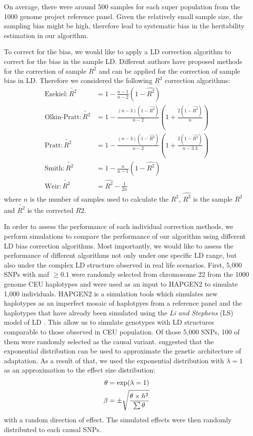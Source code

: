 		On average, there were around 500 samples for each super population from the 1000 genome project reference panel.
		Given the relatively small sample size, the sampling bias might be high, therefore lead to systematic bias in the heritability estimation in our algorithm.
		
		To correct for the bias, we would like to apply a \gls{LD} correction algorithm to correct for the bias in the sample \gls{LD}.
		Different authors \citep{Weir1980,Wang2007} have proposed methods for the correction of sample $R^2$ and can be applied for the correction of sample bias in \gls{LD}.
		Therefore we considered the following $R^2$ correction algorithms:
		\begin{align}
		\text{Ezekiel}: \tilde{R^2}&= 1-\frac{n-1}{n-2}(1-\hat{R^2})\label{eq:ezekiel} \\
		\text{Olkin-Pratt}: \tilde{R^2}&=1-\frac{(n-3)(1-\hat{R^2})}{n-2}(1+\frac{2(1-\hat{R^2})}{n})\label{eq:okin} \\
		\text{Pratt}: \tilde{R^2}&=1-\frac{(n-3)(1-\hat{R^2})}{n-2}(1+\frac{2(1-\hat{R^2})}{n-3.3})\label{eq:pratt} \\
		\text{Smith}: \tilde{R^2}&=1-\frac{n}{n-1}(1-\hat{R^2}) \label{eq:smith}\\
		\text{Weir}: \tilde{R^2}&=\hat{R^2}-\frac{1}{2n} \label{eq:weir}
		\end{align}
		where $n$ is the number of samples used to calculate the $R^2$, $\hat{R^2}$ is the sample $R^2$ and $\tilde{R^2}$ is the corrected $R2$.
		
		In order to assess the performance of each individual correction methods, we perform simulations to compare the performance of our algorithm using different \gls{LD} bias correction algorithms.
		Most importantly, we would like to assess the performance of different algorithms not only under one specific \gls{LD} range, but also under the complex \gls{LD} structure observed in real life scenarios.
		First, 5,000 \glspl{SNP} with \gls{maf} $\ge0.1$ were randomly selected from chromosome 22 from the 1000 genome \gls{CEU} haplotypes and were used as an input to HAPGEN2 \citep{Su2011} to simulate 1,000 individuals.
		HAPGEN2 is a simulation tools which simulates new haplotypes as an imperfect mosaic of haplotpyes from a reference panel and the haplotypes that have already been simulated using the \textit{Li and Stephens} (LS) model of \gls{LD} \citep{Li2003}.
		This allow us to simulate genotypes with \gls{LD} structures comparable to those observed in \gls{CEU} population. 
		Of those 5,000 \glspl{SNP}, 100 of them were randomly selected as the causal variant. 
		\citet{Orr1998} suggested that the exponential distribution can be used to approximate the genetic architecture of adaptation. 
		As a result of that, we used the exponential distribution with $\lambda=1$ as an approximation to the effect size distribution:
		\begin{align}
		\theta&=\mathrm{exp}(\lambda=1)\notag\\
		\beta&=\pm\sqrt{\frac{\theta \times h^2}{\sum \theta}}
		\label{eq:randomEffect}
		\end{align}
		with a random direction of effect.
		The simulated effects were then randomly distributed to each causal \glspl{SNP}.
			
